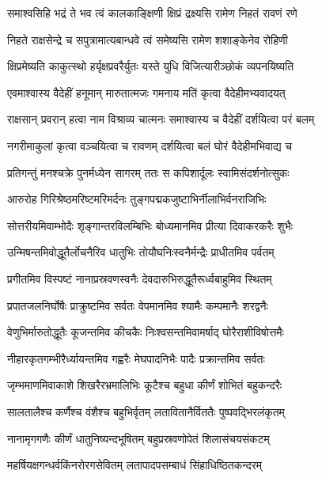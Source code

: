\twolineshloka
{समाश्वसिहि भद्रं ते भव त्वं कालकाङ्क्षिणी}
{क्षिप्रं द्रक्ष्यसि रामेण निहतं रावणं रणे} %

\twolineshloka
{निहते राक्षसेन्द्रे च सपुत्रामात्यबान्धवे}
{त्वं समेष्यसि रामेण शशाङ्केनेव रोहिणी} %

\twolineshloka
{क्षिप्रमेष्यति काकुत्स्थो हर्यृक्षप्रवरैर्युतः}
{यस्ते युधि विजित्यारीञ्छोकं व्यपनयिष्यति} %

\twolineshloka
{एवमाश्वास्य वैदेहीं हनूमान् मारुतात्मजः}
{गमनाय मतिं कृत्वा वैदेहीमभ्यवादयत्} %

\twolineshloka
{राक्षसान् प्रवरान् हत्वा नाम विश्राव्य चात्मनः}
{समाश्वास्य च वैदेहीं दर्शयित्वा परं बलम्} %

\twolineshloka
{नगरीमाकुलां कृत्वा वञ्चयित्वा च रावणम्}
{दर्शयित्वा बलं घोरं वैदेहीमभिवाद्य च} %

\twolineshloka
{प्रतिगन्तुं मनश्चक्रे पुनर्मध्येन सागरम्}
{ततः स कपिशार्दूलः स्वामिसंदर्शनोत्सुकः} %

\twolineshloka
{आरुरोह गिरिश्रेष्ठमरिष्टमरिमर्दनः}
{तुङ्गपद्मकजुष्टाभिर्नीलाभिर्वनराजिभिः} %

\twolineshloka
{सोत्तरीयमिवाम्भोदैः शृङ्गान्तरविलम्बिभिः}
{बोध्यमानमिव प्रीत्या दिवाकरकरैः शुभैः} %

\twolineshloka
{उन्मिषन्तमिवोद्धूतैर्लोचनैरिव धातुभिः}
{तोयौघनिःस्वनैर्मन्द्रैः प्राधीतमिव पर्वतम्} %

\twolineshloka
{प्रगीतमिव विस्पष्टं नानाप्रस्रवणस्वनैः}
{देवदारुभिरुद्धूतैरूर्ध्वबाहुमिव स्थितम्} %

\twolineshloka
{प्रपातजलनिर्घोषैः प्राक्रुष्टमिव सर्वतः}
{वेपमानमिव श्यामैः कम्पमानैः शरद्वनैः} %

\twolineshloka
{वेणुभिर्मारुतोद्धूतैः कूजन्तमिव कीचकैः}
{निःश्वसन्तमिवामर्षाद् घोरैराशीविषोत्तमैः} %

\twolineshloka
{नीहारकृतगम्भीरैर्ध्यायन्तमिव गह्वरैः}
{मेघपादनिभैः पादैः प्रक्रान्तमिव सर्वतः} %

\twolineshloka
{जृम्भमाणमिवाकाशे शिखरैरभ्रमालिभिः}
{कूटैश्च बहुधा कीर्णं शोभितं बहुकन्दरैः} %

\twolineshloka
{सालतालैश्च कर्णैश्च वंशैश्च बहुभिर्वृतम्}
{लतावितानैर्विततैः पुष्पवद्भिरलंकृतम्} %

\twolineshloka
{नानामृगगणैः कीर्णं धातुनिष्यन्दभूषितम्}
{बहुप्रस्रवणोपेतं शिलासंचयसंकटम्} %

\twolineshloka
{महर्षियक्षगन्धर्वकिंनरोरगसेवितम्}
{लतापादपसम्बाधं सिंहाधिष्ठितकन्दरम्} %


